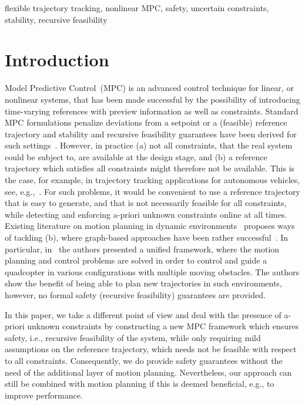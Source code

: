 \documentclass[journal]{IEEEtran}
\begin{document}
	\begin{IEEEkeywords}
		flexible trajectory tracking, nonlinear MPC, safety, uncertain constraints, stability, recursive feasibility
	\end{IEEEkeywords}
	
	\IEEEpeerreviewmaketitle
	
	\section{Introduction}\label{sec:intro}
	Model Predictive Control~(MPC) is an advanced control technique for linear, or nonlinear systems, that has been made successful by the possibility of introducing time-varying references with preview information as well as constraints.
	Standard MPC formulations penalize deviations from a setpoint or a (feasible) reference trajectory and stability and recursive feasibility guarantees have been derived for such settings~\cite{Mayne2000,rawlings2009model,borrelli2017predictive}. 
	However, in practice (a) not all constraints, that the real system could be subject to, are available at the design stage, and (b) a reference trajectory which satisfies all constraints might therefore not be available. This is the case, for example, in trajectory tracking applications for autonomous vehicles, see, e.g.,~\cite{ljungqvist2016path,ljungqvist2018stability,andersson2018receding,ljungqvist2019path}. For such problems, it would be convenient to use a reference trajectory that is easy to generate, and that is not necessarily feasible for all constraints, while detecting and enforcing a-priori unknown constraints online at all times. Existing literature on motion planning in dynamic environments~\cite{paden2016survey,mohanan2018survey} proposes ways of tackling (b), where graph-based approaches have been rather successful~\cite{fiorini1998motion,van2005roadmap,fulgenzi2008probabilistic}. In particular, in~\cite{andersson2018receding} the authors presented a unified framework, where the motion planning and control problems are solved in order to control and guide a quadcopter in various configurations with multiple moving obstacles. The authors show the benefit of being able to plan new trajectories in such environments, however, no formal safety (recursive feasibility) guarantees are provided.
			
	In this paper, we take a different point of view and deal with the presence of a-priori unknown constraints by constructing a new MPC framework which ensures safety, i.e., recursive feasibility of the system, while only requiring mild assumptions on the reference trajectory, which needs not be feasible with respect to all constraints. Consequently, we do provide safety guarantees without the need of the additional layer of motion planning. Nevertheless, our approach can still be combined with motion planning if this is deemed beneficial, e.g., to improve performance.
	
\end{document}
